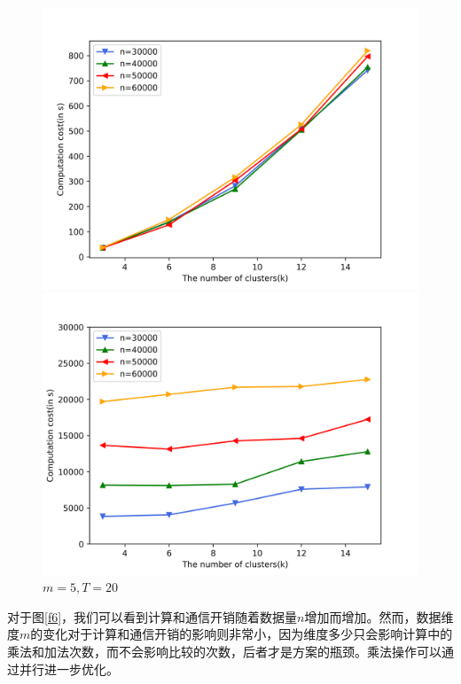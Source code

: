 \begin{figure}[htbp]
	\captionsetup{font=scriptsize}
	\begin{minipage}[t]{0.45\linewidth}
		\includegraphics[width=\linewidth]{img/k.png}
	\end{minipage}%
	\hfill%
	\begin{minipage}[t]{0.45\linewidth}
		\includegraphics[width=\linewidth]{img/k_comm.png}
	\end{minipage} 
	\caption{$m=5, T=20$}
	\label{f7}
\end{figure} 

对于图\ref{f6}，我们可以看到计算和通信开销随着数据量$ n $增加而增加。然而，数据维度$ m $的变化对于计算和通信开销的影响则非常小，因为维度多少只会影响计算中的乘法和加法次数，而不会影响比较的次数，后者才是方案的瓶颈。乘法操作可以通过并行进一步优化。

